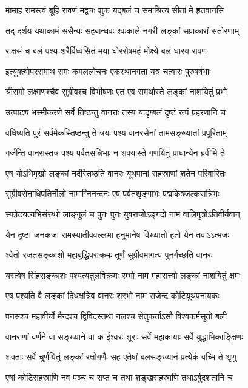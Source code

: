 \twolineshloka
{मामाह रामस्त्वं ब्रूहि रावणं मद्वचः शुक}
{यद्बलं च समाश्रित्य सीतां मे हृतवानसि} %

\twolineshloka
{तद् दर्शय यथाकामं ससैन्यः सहबान्धवः}
{श्वःकाले नगरीं लङ्कां सप्राकारां सतोरणाम्} %

\twolineshloka
{राक्षसं च बलं पश्य शरैर्विध्वंसितं मया}
{घोररोषमहं मोक्ष्ये बलं धारय रावण} %

\twolineshloka
{इत्युक्त्वोपररामाथ रामः कमललोचनः}
{एकस्थानगता यत्र चत्वारः पुरुषर्षभाः} %

\twolineshloka
{श्रीरामो लक्ष्मणश्चैव सुग्रीवश्च विभीषणः}
{एत एव समर्थास्ते लङ्कां नाशयितुं प्रभो} %

\twolineshloka
{उत्पाट्य भस्मीकरणे सर्वे तिष्ठन्तु वानराः}
{तस्य यादृग्बलं दृष्टं रूपं प्रहरणानि च} %

\twolineshloka
{वधिष्यति पुरं सर्वमेकस्तिष्ठन्तु ते त्रयः}
{पश्य वानरसेनां तामसङ्ख्यातां प्रपूरिताम्} %

\twolineshloka
{गर्जन्ति वानरास्तत्र पश्य पर्वतसन्निभाः}
{न शक्यास्ते गणयितुं प्राधान्येन ब्रवीमि ते} %

\twolineshloka
{एष योऽभिमुखो लङ्कां नदंस्तिष्ठति वानरः}
{यूथपानां सहस्राणां शतेन परिवारितः} %

\twolineshloka
{सुग्रीवसेनाधिपतिर्नीलो नामाग्निनन्दनः}
{एष पर्वतशृङ्गाभः पद्मकिञ्जल्कसन्निभः} %

\twolineshloka
{स्फोटयत्यभिसंरब्धो लाङ्गूलं च पुनः पुनः}
{युवराजोऽङ्गदो नाम वालिपुत्रोऽतिवीर्यवान्} %

\twolineshloka
{येन दृष्टा जनकजा रामस्यातीववल्लभा}
{हनूमानेष विख्यातो हतो येन तवाऽऽत्मजः} %

\twolineshloka
{श्वेतो रजतसङ्काशो महाबुद्धिपराक्रमः}
{तूर्णं सुग्रीवमागत्य पुनर्गच्छति वानरः} %

\twolineshloka
{यस्त्वेष सिंहसङ्काशः पश्यत्यतुलविक्रमः}
{रम्भो नाम महासत्त्वो लङ्कां नाशयितुं क्षमः} %

\twolineshloka
{एष पश्यति वै लङ्कां दिधक्षन्निव वानरः}
{शरभो नाम राजेन्द्र कोटियूथपनायकः} %

\twolineshloka
{पनसश्च महावीर्यो मैन्दश्च द्विविदस्तथा}
{नलश्च सेतुकर्ताऽसौ विश्वकर्मसुतो बली} %

\twolineshloka
{वानराणां वर्णने वा सङ्ख्याने वा क ईश्वरः}
{शूराः सर्वे महाकायाः सर्वे युद्धाभिकाङ्क्षिणः} %

\twolineshloka
{शक्ताः सर्वे चूर्णयितुं लङ्कां रक्षोगणैः सह}
{एतेषां बलसङ्ख्यानं प्रत्येकं वच्मि ते शृणु} %

\twolineshloka
{एषां कोटिसहस्राणि नव पञ्च च सप्त च}
{तथा शङ्खसहस्राणि तथाऽर्बुदशतानि च} %

